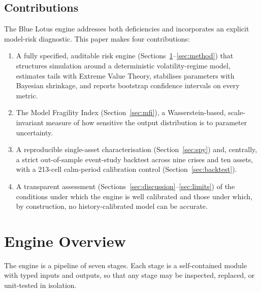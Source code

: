 \documentclass[11pt]{article}
\theoremstyle{definition}
\begin{document}
\subsection{Contributions}
The Blue Lotus engine addresses both deficiencies and incorporates an explicit
model-risk diagnostic. This paper makes four contributions:
\begin{enumerate}[leftmargin=1.6em, itemsep=2pt]
  \item A fully specified, auditable risk engine (Sections~\ref{sec:glance}--\ref{sec:method})
  that structures simulation around a deterministic volatility-regime model,
  estimates tails with Extreme Value Theory, stabilises parameters with Bayesian
  shrinkage, and reports bootstrap confidence intervals on every metric.
  \item The Model Fragility Index (Section~\ref{sec:mfi}), a Wasserstein-based,
  scale-invariant measure of how sensitive the output distribution is to
  parameter uncertainty.
  \item A reproducible single-asset characterisation (Section~\ref{sec:spy})
  and, centrally, a strict out-of-sample event-study backtest across nine
  crises and ten assets, with a 213-cell calm-period calibration control
  (Section~\ref{sec:backtest}).
  \item A transparent assessment (Sections~\ref{sec:discussion}--\ref{sec:limits})
  of the conditions under which the engine is well calibrated and those under
  which, by construction, no history-calibrated model can be accurate.
\end{enumerate}

\section{Engine Overview}
\label{sec:glance}

The engine is a pipeline of seven stages. Each stage is a self-contained module
with typed inputs and outputs, so that any stage may be inspected, replaced, or
unit-tested in isolation.
\end{document}
